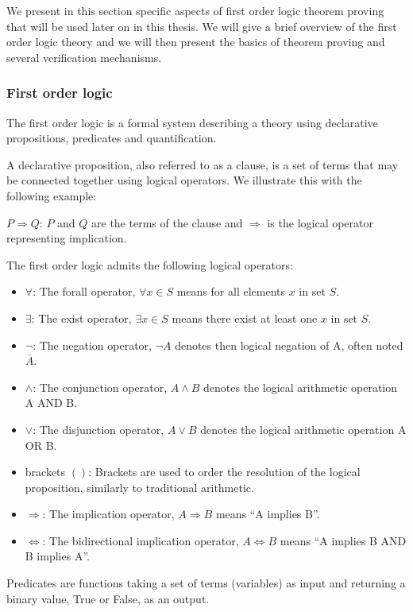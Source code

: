 \label{sec:proving-theory}
We present in this section specific aspects of first order logic theorem proving that will be used later on in this thesis. We will give a brief overview of the first order logic theory and we will then present the basics of theorem proving and several verification mechanisms.

\subsubsection{First order logic}
The first order logic is a formal system describing a theory using declarative propositions, predicates and quantification.

A declarative proposition, also referred to as a clause, is a set of terms  that may be connected together using logical operators.
We illustrate this with the following example:

$P \Rightarrow Q$: $P$ and $Q$ are the terms of the clause and $\Rightarrow$ is the logical operator representing implication.

The first order logic admits the following logical operators:

\begin{itemize}
    \item $\forall$: The forall operator, $\forall x\in S$ means for all elements $x$ in set $S$.
    \item $\exists$: The exist operator, $\exists x\in S$ means there exist at least one $x$ in set $S$.
    \item $\neg$: The negation operator, $\neg A$ denotes then logical negation of A, often noted $\overline{A}$.
    \item $\wedge$: The conjunction operator, $A \wedge B$ denotes the logical arithmetic operation A AND B.
    \item $\vee$: The disjunction operator, $A \vee B$ denotes the logical arithmetic operation A OR B.
    \item brackets $( )$: Brackets are used to order the resolution of the logical proposition, similarly to traditional arithmetic.
    \item $\Rightarrow$: The implication operator, $A \Rightarrow B$ means ``A implies B''.
    \item $\Leftrightarrow$: The bidirectional implication operator, $A \Leftrightarrow B$ means ``A implies B AND B implies A''.
\end{itemize}

Predicates are functions taking a set of terms (variables) as input and returning a binary value, True or False, as an output.

